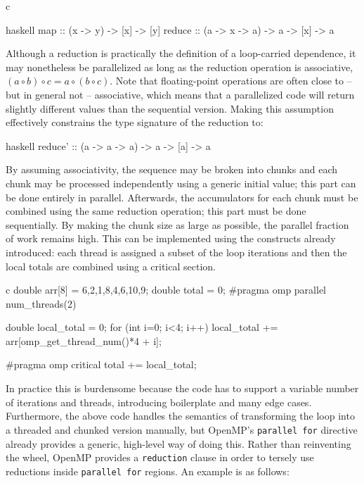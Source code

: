 \documentclass[conference, a4paper]{IEEEtran-modified}
\begin{document}
\begin{ccode}[]{c}
      \begin{ccode}[]
        {haskell}
        map :: (x -> y) -> [x] -> [y]
        reduce :: (a -> x -> a) -> a -> [x] -> a
      \end{ccode}

Although a reduction is practically the definition of a loop-carried dependence, it may nonetheless be parallelized as long as the reduction operation is associative, $(a \circ b) \circ c = a \circ (b \circ c)$. Note that floating-point operations are often close to -- but in general not -- associative, which means that a parallelized code will return slightly different values than the sequential version. Making this assumption effectively constrains the type signature of the reduction to: 

      \begin{ccode}[]
        {haskell}
        reduce' :: (a -> a -> a) -> a -> [a] -> a
      \end{ccode}

By assuming associativity, the sequence may be broken into chunks and each chunk may be processed independently using a generic initial value; this part can be done entirely in parallel. Afterwards, the accumulators for each chunk must be combined using the same reduction operation; this part must be done sequentially. By making the chunk size as large as possible, the parallel fraction of work remains high. This can be implemented using the constructs already introduced: each thread is assigned a subset of the loop iterations and then the local totals are combined using a critical section.

\begin{ccode}[]
{c}
        double arr[8] = {6,2,1,8,4,6,10,9};
        double total = 0;
        #pragma omp parallel num_threads(2)
        {
          double local_total = 0;
          for (int i=0; i<4; i++)
            local_total += arr[omp_get_thread_num()*4 + i];

          #pragma omp critical
          total += local_total;
        }
\end{ccode}

In practice this is burdensome because the code has to support a variable number of iterations and threads, introducing boilerplate and many edge cases. Furthermore, the above code handles the semantics of transforming the loop into a threaded and chunked version manually, but OpenMP's \texttt{parallel for} directive already provides a generic, high-level way of doing this. Rather than reinventing the wheel, OpenMP provides a \texttt{reduction} clause in order to tersely use reductions inside \texttt{parallel for} regions. An example is as follows:


\end{ccode}
\end{document}
